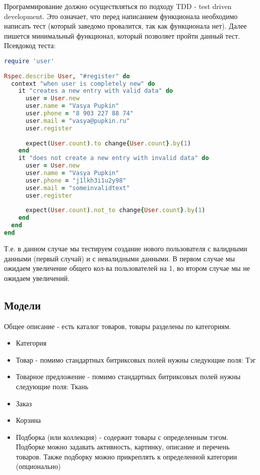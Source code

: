 \documentclass[DIV=calc, paper=a4, fontsize=11pt]{scrartcl} %
\begin{document}
Программирование должно осуществляться по подходу TDD - test driven development. Это означает, что перед написанием функционала необходимо написать тест (который заведомо провалится, так как функционала нет). Далее пишется минимальный функционал, который позволяет пройти данный тест.
\\[0.5cm]
Псевдокод теста:
\begin{lstlisting}[language=Ruby]
require 'user'
	
Rspec.describe User, "#register" do
  context "when user is completely new" do
	it "creates a new entry with valid data" do
	  user = User.new
      user.name = "Vasya Pupkin"
	  user.phone = "8 903 227 88 74"
	  user.mail = "vasya@pupkin.ru"
	  user.register
				
	  expect(User.count).to change{User.count}.by(1)
	end
    it "does not create a new entry with invalid data" do
      user = User.new
	  user.name = "Vasya Pupkin"
	  user.phone = "j1lkh3i1u2y98"
	  user.mail = "someinvalidtext"
	  user.register	
		
      expect(User.count).not_to change{User.count}.by(1)
	end
  end
end
\end{lstlisting}
Т.е. в данном случае мы тестируем создание нового пользователя с валидными данными (первый случай) и с невалидными данными. В первом случае мы ожидаем увеличение общего кол-ва пользователей на 1, во втором случае мы не ожидаем увеличений.

\subsection{Модели}
Общее описание - есть каталог товаров, товары разделены по категориям.

\begin{itemize}
	\item Категория
	\item Товар - помимо стандартных битриксовых полей нужны следующие поля: Тэг
	\item Товарное предложение - помимо стандартных битриксовых полей нужны следующие поля: Ткань
	\item Заказ
	\item Корзина
	\item Подборка (или коллекция) - содержит товары с определенным тэгом. Подборке можно задавать активность, картинку, описание и перечень товаров. Также подборку можно прикреплять к определенной категории (опционально)
\end{itemize}
\end{document}
